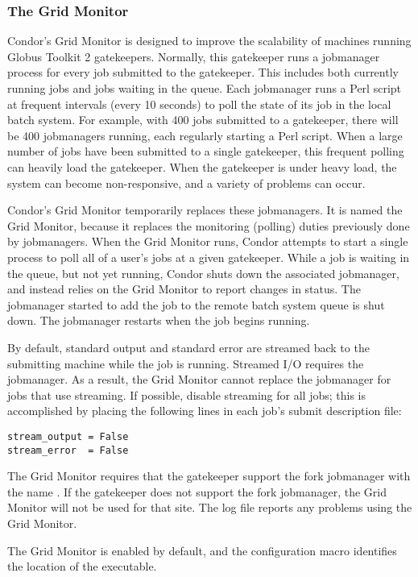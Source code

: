 \subsubsection{\label{sec:Condor-G-GridMonitor}The Grid Monitor}

Condor's Grid Monitor is designed to improve the scalability of
machines running Globus Toolkit 2 gatekeepers.
Normally, this gatekeeper runs a jobmanager process for 
every job submitted to the gatekeeper.
This includes both currently running jobs and jobs waiting in the queue.
Each jobmanager runs a Perl script at
frequent intervals (every 10 seconds) to poll the state of
its job in the local batch system.
For example, with 400 jobs submitted to a gatekeeper,
there will be 400 jobmanagers running,
each regularly starting a Perl script.
When a large number of jobs
have been submitted to a single gatekeeper,
this frequent polling can heavily load the gatekeeper.
When the gatekeeper is under heavy load,
the system can become non-responsive, and a variety of problems can occur.

Condor's Grid Monitor temporarily replaces these jobmanagers.
It is named the Grid Monitor, because it replaces the monitoring
(polling) duties previously done by jobmanagers.
When the Grid Monitor runs,
Condor attempts to start a single
process to poll all of a user's jobs at a given gatekeeper.
While a job is waiting in the queue, but not yet running,
Condor shuts down the associated jobmanager,
and instead relies on the Grid Monitor to report changes in status.
The jobmanager started to add the job to the remote
batch system queue is shut down.
The jobmanager restarts when the job begins running.

By default, standard output and standard error are streamed back
to the submitting machine while the job is running.
Streamed I/O requires the jobmanager.
As a result, the Grid Monitor cannot
replace the jobmanager for jobs that use streaming.
If possible,
disable streaming for all jobs;
this is accomplished by placing the
following lines in each job's submit description file:

\begin{verbatim}
stream_output = False
stream_error  = False
\end{verbatim}

The Grid Monitor requires that the gatekeeper support the fork
jobmanager with the name .
If the gatekeeper does not support the fork jobmanager,
the Grid Monitor will not be used for that site.
The  log file reports any problems
using the Grid Monitor.

The Grid Monitor is enabled by default,
and the
configuration macro  identifies
the location of the executable.

